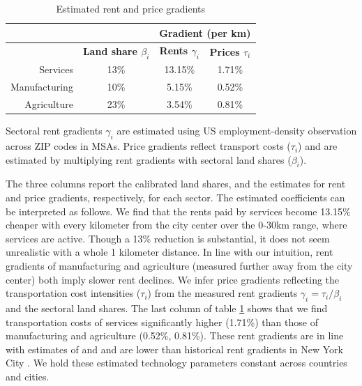 \documentclass[12pt]{article}
\begin{document}
\begin{table}[h!]
  \begin{center}
  \caption{Estimated rent and price gradients}
    \begin{tabular}{rccc}
    \toprule
    \textbf{} & \textbf{} & \multicolumn{2}{c}{\textbf{Gradient (per km)}}\\
    \midrule
    \textbf{} & \textbf{Land share $\beta_i$ } & \textbf{Rents $\gamma_i$} & \textbf{Prices $\tau_i$} \\
    Services & 13\%  & 13.15\% & 1.71\% \\
    Manufacturing & 10\%  & 5.15\% & 0.52\% \\
    Agriculture & 23\%  & 3.54\% & 0.81\% \\
    \bottomrule
    \end{tabular}%

  \end{center}
  \label{tab:EmpGrad}%

  \noindent \footnotesize{Sectoral rent gradients $\gamma_i$ are estimated using US employment-density observation across ZIP codes in MSAs. Price gradients reflect transport costs ($\tau_i$) and are estimated by multiplying rent gradients with sectoral land shares ($\beta_i$). }
\end{table}%

The three columns report the calibrated land shares, and the estimates for rent and price gradients, respectively, for each sector. The estimated coefficients can be interpreted as follows. We find that the rents paid by services become 13.15\% cheaper with every kilometer from the city center over the 0-30km range, where services are active. Though a 13\% reduction is substantial, it does not seem unrealistic with a whole 1 kilometer distance. In line with our intuition, rent gradients of manufacturing and agriculture (measured further away from the city center) both imply slower rent declines. We infer price gradients reflecting the transportation cost intensities ($\tau_i$) from the measured rent gradients $\gamma_i=\tau_i/\beta_i$ and the sectoral land shares. The last column of table \ref{tab:EmpGrad} shows that we find transportation costs of services significantly higher (1.71\%) than those of manufacturing and agriculture (0.52\%, 0.81\%). These rent gradients are in line with estimates of  and  and are lower than historical rent gradients in New York City \cite{Atack1998}. We hold these estimated technology parameters constant across countries and cities. 
\end{document}
